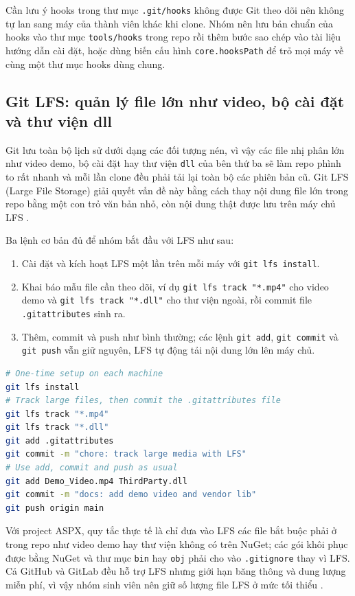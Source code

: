 Cần lưu ý hooks trong thư mục \verb|.git/hooks| không được Git theo dõi nên không tự lan sang máy của thành viên khác khi clone. Nhóm nên lưu bản chuẩn của hooks vào thư mục \verb|tools/hooks| trong repo rồi thêm bước sao chép vào tài liệu hướng dẫn cài đặt, hoặc dùng biến cấu hình \verb|core.hooksPath| để trỏ mọi máy về cùng một thư mục hooks dùng chung.

\subsection{Git LFS: quản lý file lớn như video, bộ cài đặt và thư viện dll}

Git lưu toàn bộ lịch sử dưới dạng các đối tượng nén, vì vậy các file nhị phân lớn như video demo, bộ cài đặt hay thư viện \verb|dll| của bên thứ ba sẽ làm repo phình to rất nhanh và mỗi lần clone đều phải tải lại toàn bộ các phiên bản cũ. Git LFS (Large File Storage) giải quyết vấn đề này bằng cách thay nội dung file lớn trong repo bằng một con trỏ văn bản nhỏ, còn nội dung thật được lưu trên máy chủ LFS \cite{progit}.

Ba lệnh cơ bản đủ để nhóm bắt đầu với LFS như sau:

\begin{enumerate}
\item Cài đặt và kích hoạt LFS một lần trên mỗi máy với \verb|git lfs install|.
\item Khai báo mẫu file cần theo dõi, ví dụ \verb|git lfs track "*.mp4"| cho video demo và \verb|git lfs track "*.dll"| cho thư viện ngoài, rồi commit file \verb|.gitattributes| sinh ra.
\item Thêm, commit và push như bình thường; các lệnh \verb|git add|, \verb|git commit| và \verb|git push| vẫn giữ nguyên, LFS tự động tải nội dung lớn lên máy chủ.
\end{enumerate}

\begin{lstlisting}[language=bash, caption={Ba lenh Git LFS co ban cho file lon}, label={lst:c33-lfs}]
# One-time setup on each machine
git lfs install
# Track large files, then commit the .gitattributes file
git lfs track "*.mp4"
git lfs track "*.dll"
git add .gitattributes
git commit -m "chore: track large media with LFS"
# Use add, commit and push as usual
git add Demo_Video.mp4 ThirdParty.dll
git commit -m "docs: add demo video and vendor lib"
git push origin main
\end{lstlisting}

Với project ASPX, quy tắc thực tế là chỉ đưa vào LFS các file bắt buộc phải ở trong repo như video demo hay thư viện không có trên NuGet; các gói khôi phục được bằng NuGet và thư mục \verb|bin| hay \verb|obj| phải cho vào \verb|.gitignore| thay vì LFS. Cả GitHub và GitLab đều hỗ trợ LFS nhưng giới hạn băng thông và dung lượng miễn phí, vì vậy nhóm sinh viên nên giữ số lượng file LFS ở mức tối thiểu \cite{githubdocs,gitlabdocs}.

